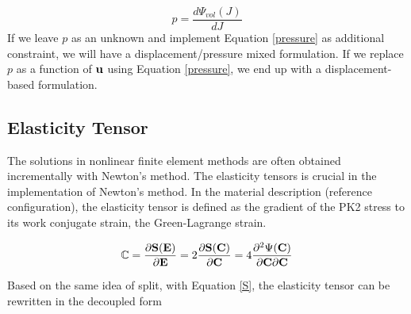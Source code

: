 \begin{equation} \label{pressure}
p = \frac{d\Psi_{vol}(J)}{dJ}
\end{equation}
If we leave $p$ as an unknown and implement Equation \ref{pressure} as additional constraint, we will have a displacement/pressure mixed formulation. If we replace $p$ as a function of $\bold{u}$ using Equation \ref{pressure}, we end up with a displacement-based formulation.

%
\subsection{Elasticity Tensor} \label{general_elasticity}
The solutions in nonlinear finite element methods are often obtained incrementally with Newton's method. The elasticity tensors is crucial in the implementation of Newton's method.
In the material description (reference configuration), the elasticity tensor is defined as the gradient of the PK2 stress to its work conjugate strain, the Green-Lagrange strain.

\begin{equation}
\mathbb{C} = \frac{\partial{\bold{S}(\bold{E})}}{\partial{\bold{E}}} =  2\frac{\partial{\bold{S}(\bold{C})}} {\partial{\bold{C}}} = 4 \frac{\partial^2{\Psi(\bold{C})}}{{\partial{\bold{C}}}{\partial{\bold{C}}}}
\end{equation}

Based on the same idea of split, with Equation \ref{S}, the elasticity tensor can be rewritten in the decoupled form 


